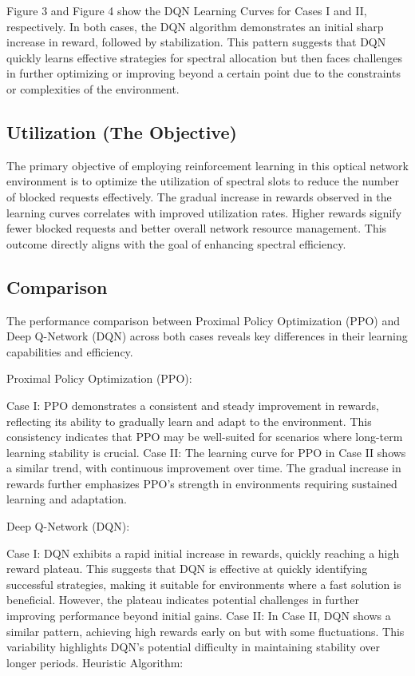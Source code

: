 \documentclass[conference]{IEEEtran}
\begin{document}
Figure 3 and Figure 4 show the DQN Learning Curves for Cases I and II, respectively. In both cases, the DQN algorithm demonstrates an initial sharp increase in reward, followed by stabilization. This pattern suggests that DQN quickly learns effective strategies for spectral allocation but then faces challenges in further optimizing or improving beyond a certain point due to the constraints or complexities of the environment.

\subsection{Utilization (The Objective)}
The primary objective of employing reinforcement learning in this optical network environment is to optimize the utilization of spectral slots to reduce the number of blocked requests effectively. The gradual increase in rewards observed in the learning curves correlates with improved utilization rates. Higher rewards signify fewer blocked requests and better overall network resource management. This outcome directly aligns with the goal of enhancing spectral efficiency.

\subsection{Comparison}
The performance comparison between Proximal Policy Optimization (PPO) and Deep Q-Network (DQN) across both cases reveals key differences in their learning capabilities and efficiency.


Proximal Policy Optimization (PPO):

Case I: PPO demonstrates a consistent and steady improvement in rewards, reflecting its ability to gradually learn and adapt to the environment. This consistency indicates that PPO may be well-suited for scenarios where long-term learning stability is crucial.
Case II: The learning curve for PPO in Case II shows a similar trend, with continuous improvement over time. The gradual increase in rewards further emphasizes PPO’s strength in environments requiring sustained learning and adaptation.

Deep Q-Network (DQN):

Case I: DQN exhibits a rapid initial increase in rewards, quickly reaching a high reward plateau. This suggests that DQN is effective at quickly identifying successful strategies, making it suitable for environments where a fast solution is beneficial. However, the plateau indicates potential challenges in further improving performance beyond initial gains.
Case II: In Case II, DQN shows a similar pattern, achieving high rewards early on but with some fluctuations. This variability highlights DQN’s potential difficulty in maintaining stability over longer periods.
Heuristic Algorithm:
\end{document}

